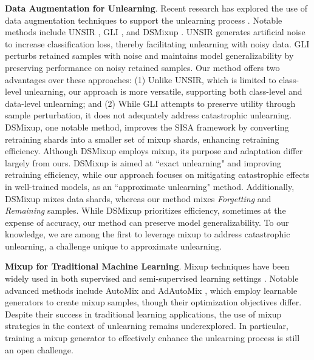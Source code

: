 \textbf{Data Augmentation for Unlearning}. Recent research has explored the use of data augmentation techniques to support the unlearning process \citep{chundawat2023zero, tarun2023fast, huang2021unlearnable, choi2024towards}. Notable methods include UNSIR \citep{tarun2023fast}, GLI \citep{choi2024towards}, and DSMixup \citep{zhou2022dynamically}. UNSIR generates artificial noise to increase classification loss, thereby facilitating unlearning with noisy data. GLI perturbs retained samples with noise and maintains model generalizability by preserving performance on noisy retained samples. Our method offers two advantages over these approaches: (1) Unlike UNSIR, which is limited to class-level unlearning, our approach is more versatile, supporting both class-level and data-level unlearning; and (2) While GLI attempts to preserve utility through sample perturbation, it does not adequately address catastrophic unlearning. DSMixup, one notable method, improves the SISA framework by converting retraining shards into a smaller set of mixup shards, enhancing retraining efficiency. Although DSMixup employs mixup, its purpose and adaptation differ largely from ours. DSMixup is aimed at ``exact unlearning" and improving retraining efficiency, while our approach focuses on mitigating catastrophic effects in well-trained models, as an ``approximate unlearning" method. Additionally, DSMixup mixes data shards, whereas our method mixes \textit{Forgetting} and \textit{Remaining} samples. While DSMixup prioritizes efficiency, sometimes at the expense of accuracy, our method can preserve model generalizability. To our knowledge, we are among the first to leverage mixup to address catastrophic unlearning, a challenge unique to approximate unlearning.

\textbf{Mixup for Traditional Machine Learning}. Mixup techniques have been widely used in both supervised and semi-supervised learning settings \citep{zhang2018mixup, verma2022interpolation, berthelot2019mixmatch, jin2024survey}. Notable advanced methods include AutoMix \citep{liu2022automix} and AdAutoMix \citep{qin2024adversarial}, which employ learnable generators to create mixup samples, though their optimization objectives differ. Despite their success in traditional learning applications, the use of mixup strategies in the context of unlearning remains underexplored. In particular, training a mixup generator to effectively enhance the unlearning process is still an open challenge.
